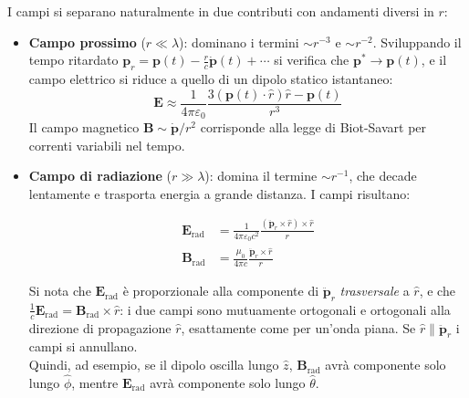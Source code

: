 I campi si separano naturalmente in due contributi con andamenti diversi in $r$:

\begin{itemize}
    \item \textbf{Campo prossimo} ($r \ll \lambda$): dominano i termini 
    $\sim r^{-3}$ e $\sim r^{-2}$. Sviluppando il tempo ritardato 
    $\mathbf{p}_r = \mathbf{p}(t) - \frac{r}{c}\dot{\mathbf{p}}(t) + \cdots$ 
    si verifica che $\mathbf{p}^* \to \mathbf{p}(t)$, e il campo elettrico 
    si riduce a quello di un dipolo statico istantaneo:
    \begin{equation}
        \mathbf{E} \approx \frac{1}{4\pi\varepsilon_0} 
        \frac{3(\mathbf{p}(t)\cdot\hat{r})\hat{r} - \mathbf{p}(t)}{r^3}
    \end{equation}
    Il campo magnetico $\mathbf{B} \sim \dot{\mathbf{p}}/r^2$ corrisponde 
    alla legge di Biot-Savart per correnti variabili nel tempo.

\newpage

    \item \textbf{Campo di radiazione} ($r \gg \lambda$): domina il termine $\sim r^{-1}$, che decade lentamente e trasporta energia a grande distanza. I campi risultano:

    \begin{tcolorbox}[colback=yellow!10!white, colframe=orange!70!black, boxrule=0.8pt]
    \begin{align}
        \mathbf{E}_{\text{rad}} &= \frac{1}{4\pi\varepsilon_0 c^2} 
        \frac{(\ddot{\mathbf{p}}_r \times \hat{r}) \times \hat{r}}{r} 
        \label{eq: E_rad_dipolo}\\[6pt]
        \mathbf{B}_{\text{rad}} &= \frac{\mu_0}{4\pi c} 
        \frac{\ddot{\mathbf{p}}_r \times \hat{r}}{r}
        \label{eq: B_rad_dipolo}
    \end{align}
    \end{tcolorbox}

    Si nota che $\mathbf{E}_{\text{rad}}$ è proporzionale alla componente di $\ddot{\mathbf{p}}_r$ \emph{trasversale} a $\hat{r}$, e che $\frac{1}{c}\mathbf{E}_{\text{rad}} = \mathbf{B}_{\text{rad}} \times \hat{r}$: i due campi sono mutuamente ortogonali e ortogonali alla direzione di propagazione $\hat{r}$, esattamente come per un'onda piana. 
    Se $\hat{r} \parallel \ddot{\mathbf{p}}_r$ i campi si annullano.\\

    Quindi, ad esempio, se il dipolo oscilla lungo $\hat{z}$, $\mathbf{B}_{\text{rad}}$ avrà componente solo lungo $\hat{\phi}$, mentre $\mathbf{E}_{\text{rad}}$ avrà componente solo lungo $\hat{\theta}$.
\end{itemize}


